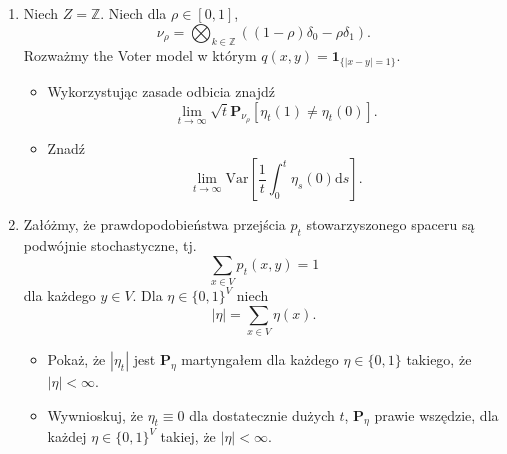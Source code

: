 \documentclass{article}
\begin{document}
\begin{enumerate}
	\item Niech $Z = \mathbb{Z}$. Niech dla $\rho\in [0,1]$, 
		\begin{equation*}
			\nu_\rho = \bigotimes_{k \in \mathbb{Z}}((1-\rho)\delta_0 - \rho \delta_1).
		\end{equation*}
		Rozważmy the Voter model w którym $q(x,y) =\mathbf{1}_{\{|x-y|=1\}}$.
		\begin{itemize}
			\item Wykorzystując zasade odbicia znajdź
				\begin{equation*}
					\lim_{t \to \infty} \sqrt{t} 
					\mathbf{P}_{\nu_\rho}[\eta_t(1) \neq \eta_t(0)].
				\end{equation*}
			\item Znadź
				\begin{equation*}
					\lim_{t \to \infty} 
					\mathrm{Var} \left[\frac 1t 
					\int_0^t \eta_s(0) \mathrm{d}s \right].
				\end{equation*}
		\end{itemize}
	\item Załóżmy, że prawdopodobieństwa przejścia $p_t$ stowarzyszonego spaceru są podwójnie 
		stochastyczne, tj. 
		\begin{equation*}
			\sum_{x \in V}p_t(x,y)=1
		\end{equation*}
		dla każdego $y \in V$. Dla $\eta \in \{0,1\}^V$ niech
		\begin{equation*}
			|\eta| = \sum_{x \in V} \eta(x).
		\end{equation*}
		\begin{itemize}
			\item Pokaż, że $|\eta_t|$ jest $\mathbf{P}_\eta$ martyngałem dla każdego $\eta \in \{0,1\}$ takiego, że $|\eta|<\infty$.
			\item Wywnioskuj, że $\eta_t \equiv 0$ dla dostatecznie dużych $t$, $\mathbf{P}_\eta$ prawie wszędzie, dla każdej $\eta \in \{0,1\}^V$ takiej, że $|\eta|<\infty$.
		\end{itemize}
\end{enumerate}
\end{document}
